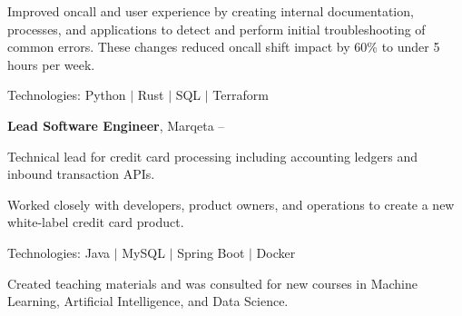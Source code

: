 \documentclass[MMMMyyyy,nonstopmode]{simpleresumecv_stacked}
\newcommand{\tech}[1]{\Gap\textrm{Technologies:} #1}
\newif\ifLOCATION
\begin{document}
\begin{Body}
\begin{Detail}
\BulletItem
Improved oncall and user experience by creating internal documentation, processes, and applications to detect and perform initial troubleshooting of common errors.
These changes reduced oncall shift impact by 60\% to under 5 hours per week.


\fi 		%

\tech{Python $|$ Rust $|$ SQL $|$ Terraform}

\end{Detail}

\BigGap

\Entry
\textbf{Lead Software Engineer}, Marqeta
\hfill
 -- 

\ifLOCATION
\hfill
Rochester, New York
\fi
\Gap
\begin{Detail}
Technical lead for credit card processing including accounting ledgers and inbound transaction APIs.

\Gap

\BulletItem
Worked closely with developers, product owners, and operations to create a new white-label credit card product. 

\tech{Java $|$ MySQL $|$ Spring Boot $|$ Docker}

\end{Detail}

\iffalse %

\Entry
\textbf{Consultant - Logical Operations} \textit{(Part-Time)}
\hfill
Occasionally since \DatestampY{2020}

\ifLOCATION
\hfill 
Rochester, New York
\fi

\begin{Detail}
\BulletItem
Created teaching materials and was consulted for new courses in Machine Learning, Artificial Intelligence, and Data Science.
\end{Detail}
\fi %


\end{Body}
\end{document}
